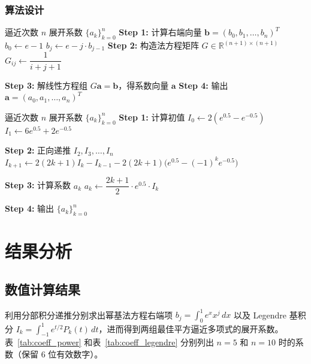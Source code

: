 \documentclass{article}
\begin{document}
\subsubsection{算法设计}
\begin{algorithm}[H]
\caption{求函数$e^{x}$的最佳平方逼近多项式，基函数为$\varphi_{k}(x) = x^{k}$}
\begin{algorithmic}[1]
    \REQUIRE 逼近次数 $n$
    \ENSURE 展开系数 $\{a_k\}_{k=0}^{n}$
    \STATE \textbf{Step 1:} 计算右端向量 $\mathbf{b} = (b_0, b_1, \dots, b_n)^T$
    \STATE \quad $b_0 \gets e - 1$
        \STATE $b_j \gets e - j \cdot b_{j-1}$ 
    \ENDFOR
    \STATE \textbf{Step 2:} 构造法方程矩阵 $G \in \mathbb{R}^{(n+1)\times (n+1)}$
            \STATE $G_{ij} \gets \dfrac{1}{i+j+1}$ 
        \ENDFOR
    \ENDFOR

    \STATE \textbf{Step 3:} 解线性方程组 $G \mathbf{a} = \mathbf{b}$，得系数向量 $\mathbf{a}$
    \STATE \textbf{Step 4:} 输出 $\mathbf{a} = (a_0, a_1, \dots, a_n)^T$

\end{algorithmic}
\end{algorithm}

\begin{algorithm}[H]
\caption{求函数$e^{x}$的最佳平方逼近多项式，基函数为Legendre多项式}
\begin{algorithmic}[1]
    \REQUIRE 逼近次数 $n$
    \ENSURE 展开系数 $\{a_k\}_{k=0}^{n}$
    \STATE \textbf{Step 1:} 计算初值
    \STATE \quad $I_0 \gets 2(e^{0.5} - e^{-0.5})$
    \STATE \quad $I_1 \gets 6 e^{0.5} + 2 e^{-0.5}$

    \STATE \textbf{Step 2:} 正向递推 $I_2, I_3, \dots, I_n$
        \STATE $I_{k+1} \gets 2(2k+1) I_k - I_{k-1} - 2(2k+1)\bigl( e^{0.5} - (-1)^k e^{-0.5} \bigr)$
    \ENDFOR

    \STATE \textbf{Step 3:} 计算系数 $a_k$
        \STATE $a_k \gets \dfrac{2k+1}{2} \cdot e^{0.5} \cdot I_k$
    \ENDFOR

    \STATE \textbf{Step 4:} 输出 $\{a_k\}_{k=0}^{n}$
\end{algorithmic}
\end{algorithm}
\section{结果分析}
\subsection{数值计算结果}
利用分部积分递推分别求出幂基法方程右端项 $b_j = \int_0^1 e^x x^j\,dx$ 以及 Legendre 基积分 $I_k = \int_{-1}^1 e^{t/2} P_k(t)\,dt$，进而得到两组最佳平方逼近多项式的展开系数。表~\ref{tab:coeff_power} 和表~\ref{tab:coeff_legendre} 分别列出 $n=5$ 和 $n=10$ 时的系数（保留 6 位有效数字）。
\end{document}
